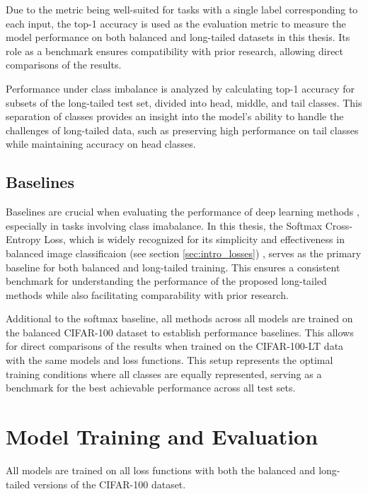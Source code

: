 Due to the metric being well-suited for tasks with a single label corresponding to each input, the top-1 accuracy is used as the evaluation metric to measure the model performance on both balanced and long-tailed datasets in this thesis. Its role as a benchmark ensures compatibility with prior research, allowing direct comparisons of the results.

Performance under class imbalance is analyzed by calculating top-1 accuracy for subsets of the long-tailed test set, divided into head, middle, and tail classes. This separation of classes provides an insight into the model's ability to handle the challenges of long-tailed data, such as preserving high performance on tail classes while maintaining accuracy on head classes.


\subsection{Baselines}
Baselines are crucial when evaluating the performance of deep learning methods , especially in tasks involving class imabalance. In this thesis, the Softmax Cross-Entropy Loss, which is widely recognized for its simplicity and effectiveness in balanced image classificaion (see section \ref{sec:intro_losses}) , serves as the primary baseline for both balanced and long-tailed training. This ensures a consistent benchmark for understanding the performance of the proposed long-tailed methods while also facilitating comparability with prior research.

Additional to the softmax baseline, all methods across all models are trained on the balanced CIFAR-100 dataset to establish performance baselines. This allows for direct comparisons of the results when trained on the CIFAR-100-LT data with the same models and loss functions. This setup represents the optimal training conditions where all classes are equally represented, serving as a benchmark for the best achievable performance across all test sets.

\section{Model Training and Evaluation}
All models are trained on all loss functions with both the balanced and long-tailed versions of the CIFAR-100 dataset.

